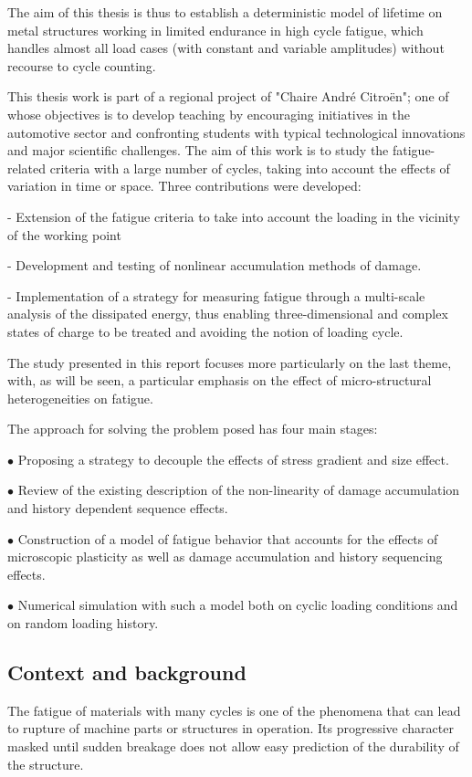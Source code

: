 The aim of this thesis is thus to establish a deterministic model of lifetime
on metal structures working in limited endurance in high cycle fatigue, which handles almost all load cases
(with constant and variable amplitudes) without recourse to cycle counting.

This thesis work is part of a regional project of "Chaire André Citroën"; one of whose objectives is to develop teaching by encouraging initiatives in the automotive sector and confronting students with typical technological innovations and major scientific challenges. The aim of this work is to study the fatigue-related criteria with a large number of cycles, taking into account the effects of variation in time or space. Three contributions were developed:

- Extension of the fatigue criteria to take into account the loading in the vicinity of the working point

- Development and testing of nonlinear accumulation methods of damage.

- Implementation of a strategy for measuring fatigue through a multi-scale analysis of the dissipated energy, thus enabling three-dimensional and complex states of charge to be treated and avoiding the notion of loading cycle.

The study presented in this report focuses more particularly on the last theme, with, as will be seen, a particular emphasis on the effect of micro-structural heterogeneities on fatigue.



The approach for solving the problem posed has four main stages:

$\bullet$ Proposing a strategy to decouple the effects of stress gradient and size effect.

$\bullet$ Review of the existing description of the non-linearity of damage accumulation and history dependent sequence effects.

$\bullet$ Construction of a model of fatigue behavior that accounts for the effects of
microscopic plasticity as well as damage accumulation and history sequencing effects. 

$\bullet$ Numerical simulation with such a model both on cyclic loading conditions and on random loading history.




\subsection{Context and background}
The fatigue of materials with many cycles is one of the phenomena that can lead to
rupture of machine parts or structures in operation. Its progressive character
masked until sudden breakage does not allow easy prediction of the durability of the
structure.

